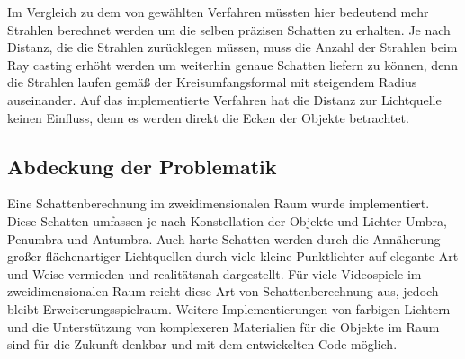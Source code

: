 Im Vergleich zu dem von gewählten Verfahren müssten hier bedeutend mehr Strahlen berechnet werden um die
selben präzisen Schatten zu erhalten. Je nach Distanz, die die Strahlen zurücklegen müssen, muss die Anzahl
der Strahlen beim Ray casting erhöht werden um weiterhin genaue Schatten liefern zu können, denn die Strahlen
laufen gemäß der Kreisumfangsformal mit steigendem Radius auseinander. Auf das implementierte Verfahren hat
die Distanz zur Lichtquelle keinen Einfluss, denn es werden direkt die Ecken der Objekte betrachtet.

\subsection{Abdeckung der Problematik}

Eine Schattenberechnung im zweidimensionalen Raum wurde implementiert. Diese Schatten umfassen je nach Konstellation der Objekte und Lichter Umbra, Penumbra
und Antumbra. Auch harte Schatten werden durch die Annäherung
großer flächenartiger Lichtquellen durch viele kleine Punktlichter auf elegante Art und Weise vermieden und realitätsnah
dargestellt. Für viele Videospiele im zweidimensionalen Raum reicht diese Art von Schattenberechnung aus,
jedoch bleibt Erweiterungsspielraum. Weitere Implementierungen von farbigen Lichtern und die Unterstützung
von komplexeren Materialien für die Objekte im Raum sind für die Zukunft denkbar und mit dem entwickelten Code möglich.
